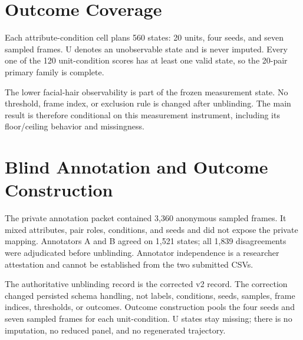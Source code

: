 \documentclass[10pt,twocolumn,letterpaper]{article}
\begin{document}
\section{Outcome Coverage}

Each attribute-condition cell plans 560 states: 20 units, four seeds, and seven
sampled frames.  U denotes an unobservable state and is never imputed.  Every
one of the 120 unit-condition scores has at least one valid state, so the
20-pair primary family is complete.

\begin{table}[h]
\centering
\caption{Frozen condition-level coverage.}
\label{tab:coverage}
\end{table}

The lower facial-hair observability is part of the frozen measurement state.
No threshold, frame index, or exclusion rule is changed after unblinding.  The
main result is therefore conditional on this measurement instrument, including
its floor/ceiling behavior and missingness.

\section{Blind Annotation and Outcome Construction}

The private annotation packet contained 3,360 anonymous sampled frames.  It
mixed attributes, pair roles, conditions, and seeds and did not expose the
private mapping.  Annotators A and B agreed on 1,521 states; all 1,839
disagreements were adjudicated before unblinding.  Annotator independence is a
researcher attestation and cannot be established from the two submitted CSVs.

The authoritative unblinding record is the corrected v2 record.  The correction
changed persisted schema handling, not labels, conditions, seeds, samples,
frame indices, thresholds, or outcomes.  Outcome construction pools the four
seeds and seven sampled frames for each unit-condition.  U states stay missing;
there is no imputation, no reduced panel, and no regenerated trajectory.
\end{document}
